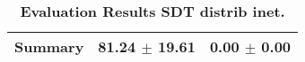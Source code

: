 \begin{table}[htb]
{\begin{tabular}{lll}
\midrule
\textbf{Summary                                  } &                  \phantom{0}81.24 $\pm$ 19.61 &              \phantom{0}0.00 $\pm$ \phantom{0}0.00 \\
\bottomrule
\end{tabular}%
}
\caption{\textbf{Evaluation Results SDT distrib inet.}}
\label{tab:eval-results}
\end{table}
